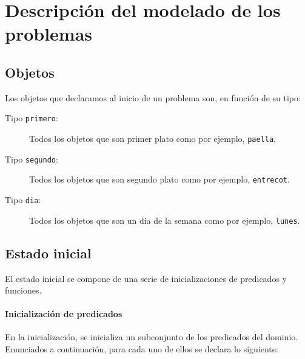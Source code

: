 \section{Descripción del modelado de los problemas}

\subsection{Objetos}
Los objetos que declaramos al inicio de un problema son, en función de su
tipo:
\begin{description}
  \item[Tipo \texttt{primero}:] 
    Todos los objetos que 
    son primer plato
    como por ejemplo, \texttt{paella}.
  \item[Tipo \texttt{segundo}:] 
    Todos los objetos que 
    son segundo plato
    como por ejemplo, \texttt{entrecot}.
  \item[Tipo \texttt{dia}:] 
    Todos los objetos que 
    son un dia de la semana
    como por ejemplo, \texttt{lunes}.
\end{description}

\subsection{Estado inicial}

El estado inicial se compone de una serie de inicializaciones de
predicados y funciones.

\paragraph{Inicialización de predicados}

En la inicialización, se inicializa un subconjunto de los
predicados del dominio. Enunciados a continuación, para cada
uno de ellos se declara lo siguiente:

